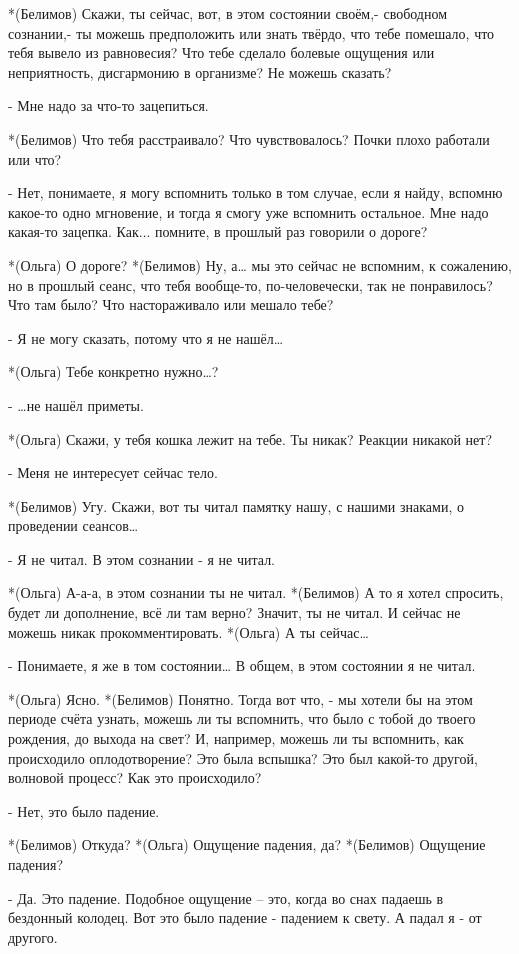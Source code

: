 *(Белимов) Скажи, ты сейчас, вот, в этом состоянии своём,- свободном сознании,- ты можешь предположить или знать твёрдо, что тебе помешало, что тебя вывело из равновесия? Что тебе сделало болевые ощущения или неприятность, дисгармонию в организме?  Не можешь сказать?

- Мне надо за что-то зацепиться.

*(Белимов) Что тебя расстраивало? Что чувствовалось? Почки плохо работали или что?

- Нет, понимаете, я могу вспомнить только в том случае, если я найду, вспомню какое-то одно мгновение, и тогда я смогу уже вспомнить остальное. Мне надо какая-то зацепка. Как... помните, в прошлый раз говорили о дороге?

*(Ольга) О дороге?
*(Белимов) Ну, а… мы это сейчас не вспомним, к сожалению, но в прошлый сеанс, что тебя вообще-то, по-человечески, так не понравилось? Что там было? Что настораживало или мешало тебе?

- Я не могу сказать, потому что я не нашёл…

*(Ольга) Тебе конкретно нужно…?

- …не нашёл приметы.

*(Ольга) Скажи, у тебя кошка лежит на тебе. Ты никак? Реакции никакой нет?

- Меня не интересует сейчас тело.

*(Белимов) Угу. Скажи, вот ты читал памятку нашу, с нашими знаками, о проведении сеансов…

- Я не читал. В этом сознании  - я не читал.

*(Ольга) А-а-а, в этом сознании ты не читал.
*(Белимов) А то я хотел спросить, будет ли дополнение, всё ли там верно? Значит, ты не читал. И сейчас не можешь никак прокомментировать.
*(Ольга) А ты сейчас…

- Понимаете, я же в том состоянии… В общем, в этом состоянии я не читал.

*(Ольга) Ясно.
*(Белимов) Понятно. Тогда вот что, - мы хотели бы на этом периоде счёта узнать, можешь ли ты вспомнить, что было с тобой до твоего рождения, до выхода на свет? И, например, можешь ли ты вспомнить, как происходило оплодотворение? Это была вспышка? Это был какой-то другой, волновой процесс? Как это происходило?

- Нет, это было падение.

*(Белимов) Откуда?
*(Ольга) Ощущение падения, да?
*(Белимов) Ощущение падения?

- Да. Это падение. Подобное ощущение – это, когда во снах падаешь в бездонный колодец. Вот это было падение - падением к свету. А падал я - от другого.


